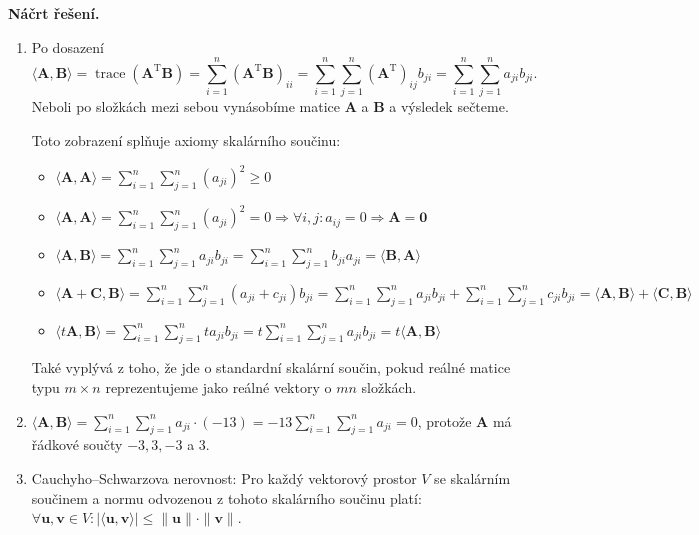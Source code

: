 \medskip
\noindent\textbf{Náčrt řešení.}\par
\begin{enumerate}
  \item Po dosazení
    \[
      \langle \mathbf{A}, \mathbf{B} \rangle = \operatorname{trace}(\mathbf{A}^{\mathrm{T}} \mathbf{B})
      = \sum_{i=1}^{n} (\mathbf{A}^{\mathrm{T}} \mathbf{B})_{ii}
      = \sum_{i=1}^{n} \sum_{j=1}^{n} (\mathbf{A}^{\mathrm{T}})_{ij} b_{ji}
      = \sum_{i=1}^{n} \sum_{j=1}^{n} a_{ji} b_{ji}.
    \]
    Neboli po složkách mezi sebou vynásobíme matice $\mathbf{A}$ a $\mathbf{B}$ a výsledek sečteme.

    Toto zobrazení splňuje axiomy skalárního součinu:
    \begin{itemize}
      \item $\langle \mathbf{A}, \mathbf{A} \rangle = \sum_{i=1}^{n} \sum_{j=1}^{n} (a_{ji})^2 \ge 0$
      \item $\langle \mathbf{A}, \mathbf{A} \rangle = \sum_{i=1}^{n} \sum_{j=1}^{n} (a_{ji})^2 = 0 \Rightarrow \forall i,j : a_{ij} = 0 \Rightarrow \mathbf{A} = \mathbf{0}$
      \item $\langle \mathbf{A}, \mathbf{B} \rangle = \sum_{i=1}^{n} \sum_{j=1}^{n} a_{ji} b_{ji} = \sum_{i=1}^{n} \sum_{j=1}^{n} b_{ji} a_{ji} = \langle \mathbf{B}, \mathbf{A} \rangle$
      \item $\langle \mathbf{A} + \mathbf{C}, \mathbf{B} \rangle = \sum_{i=1}^{n} \sum_{j=1}^{n} (a_{ji} + c_{ji}) b_{ji} = \sum_{i=1}^{n} \sum_{j=1}^{n} a_{ji} b_{ji} + \sum_{i=1}^{n} \sum_{j=1}^{n} c_{ji} b_{ji} = \langle \mathbf{A}, \mathbf{B} \rangle + \langle \mathbf{C}, \mathbf{B} \rangle$
      \item $\langle t\mathbf{A}, \mathbf{B} \rangle = \sum_{i=1}^{n} \sum_{j=1}^{n} t a_{ji} b_{ji} = t \sum_{i=1}^{n} \sum_{j=1}^{n} a_{ji} b_{ji} = t \langle \mathbf{A}, \mathbf{B} \rangle$
    \end{itemize}
    Také vyplývá z toho, že jde o standardní skalární součin, pokud reálné matice typu $m \times n$ reprezentujeme jako reálné vektory o $mn$ složkách.

  \item $\langle \mathbf{A}, \mathbf{B} \rangle = \sum_{i=1}^{n} \sum_{j=1}^{n} a_{ji} \cdot (-13) = -13 \sum_{i=1}^{n} \sum_{j=1}^{n} a_{ji} = 0$, protože $\mathbf{A}$ má řádkové součty $-3, 3, -3$ a $3$.

  \item Cauchyho--Schwarzova nerovnost: Pro každý vektorový prostor $V$ se skalárním součinem a normu odvozenou z tohoto skalárního součinu platí: $\forall \mathbf{u}, \mathbf{v} \in V : |\langle \mathbf{u}, \mathbf{v} \rangle| \le \|\mathbf{u}\| \cdot \|\mathbf{v}\|$.


\end{enumerate}
